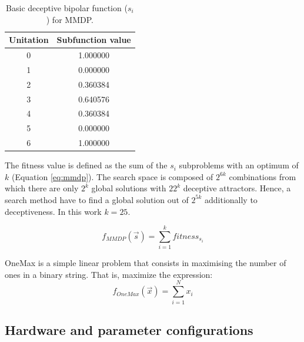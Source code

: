 \documentclass[final,1p,times]{elsarticle}
\begin{document}
\begin{table}

\centering
{\scriptsize
\caption{ Basic deceptive bipolar function ($s_i$) for MMDP.}
\label{table:mmdpvalues}
\begin{tabular}{|c|c|}
\hline
Unitation&Subfunction value\\
\hline
0 & 1.000000 \\
\hline
1 & 0.000000 \\
\hline
2 & 0.360384 \\
\hline
3 & 0.640576\\
\hline
4 & 0.360384\\
\hline
5 & 0.000000\\
\hline
6 & 1.000000\\
\hline

\end{tabular}
}


\end{table}



The fitness value is defined as the sum of the $s_i$ subproblems with an optimum of $k$ (Equation \ref{eq:mmdp}).
The search space is composed of $2^{6k}$ combinations from which there
are only $2^k$ global solutions with $22^k$ deceptive
attractors. Hence, a search method have to find a global solution
out of $2^{5k}$ additionally to deceptiveness. In this work $k=25$. 

\begin{equation}\label{eq:mmdp}
f_{MMDP}(\vec s)= \sum_{i=1}^{k} fitness_{s_i}
\end{equation}

OneMax is a simple linear problem that consists in maximising the number of ones in a binary string. That is, maximize the expression:
\begin{equation}
f_{OneMax}(\vec{x}) = \sum_{i=1}^{N}{x_{i}}
\end{equation}


\subsection{Hardware and parameter configurations}


\end{document}

